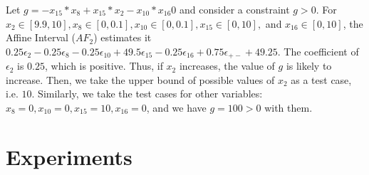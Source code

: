 \documentclass[runningheads,a4paper,oribibl]{llncs}
\newcommand{\suppress}[1]{} %
\begin{document}
\begin{example}
  Let $g = -x_{15}*x_8+x_{15}*x_2-x_{10}*x_{16}0$ and consider a constraint $g > 0$. 
  For ${x_2 \in [9.9, 10]}, {x_8 \in [0, 0.1]}, {x_{10} \in [0, 0.1]}, {x_{15} \in [0, 10]},$ and
  $ x_{16} \in [0, 10]$, the Affine Interval ($AF_2$) estimates it 
  ${0.25 \epsilon_2 - 0.25 \epsilon_8 - 0.25 \epsilon_{10} + 49.5\epsilon_{15} - 0.25\epsilon_{16}
    + 0.75\epsilon_{+-} + 49.25}$.
  The coefficient of $\epsilon_2$ is $0.25$, which is positive. 
  Thus, if $x_2$ increases, the value of $g$ is likely to increase.
  Then, we take the upper bound of possible values of $x_2$ as a test case, i.e. $10$. 
  Similarly, we take the test cases for other variables: $x_8=0, x_{10}=0, x_{15}=10, x_{16}=0$, and 
  we have $g=100 > 0$ with them. 
\end{example}
\suppress{
I. Selecting API for testing:
  (1) Difficulty first by SAT-likelihood.   
  (2) Easy first by SAT-likelihood
  (10) Random.,
II. Selecting Variable:
  (8) With sensitivity
  (9) Without sensitivity - Random: 
III. Selecting box:
  (3) SAT-directed using IA-Testing.
  (4) UNSAT-directed using IA-Testing.
  (5) SAT-directed using SAT-likelihood
  (6) UNSAT-directed using SAT-likelihood
  (7) Random
}

\section{Experiments} \label{sec:experiment}
\end{document}
